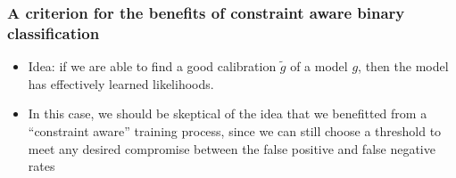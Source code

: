 \documentclass{beamer}
\begin{document}
\begin{frame}
\frametitle{A criterion for the benefits of constraint aware binary classification}
\begin{itemize}
\item
Idea: if we are able to find a good calibration $\tilde g$ of a model $g$, then the model has effectively learned likelihoods.
\item
In this case, we should be skeptical of the idea that we benefitted from a ``constraint aware'' training process, since we can still choose a threshold to meet any desired compromise between the false positive and false negative rates
\end{itemize}
\end{frame}
\end{document}
